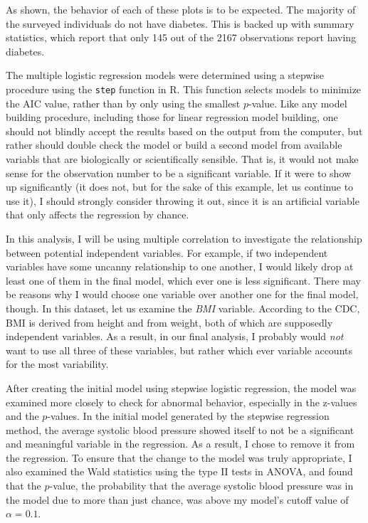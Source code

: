 \documentclass[letter,12pt]{article}
\begin{document}
	As shown, the behavior of each of these plots is to be expected. The majority of the surveyed individuals do not have diabetes. This is backed up with summary statistics, which report that only 145 out of the 2167 observations report having diabetes.\par
	The multiple logistic regression models were determined using a stepwise procedure using the \verb|step| function in R. This function selects models to minimize the AIC value, rather than by only using the smallest $p$-value. Like any model building procedure, including those for linear regression model building, one should not blindly accept the results based on the output from the computer, but rather should double check the model or build a second model from available variabls that are biologically or scientifically sensible. That is, it would not make sense for the observation number to be a significant variable. If it were to show up significantly (it does not, but for the sake of this example, let us continue to use it), I should strongly consider throwing it out, since it is an artificial variable that only affects the regression by chance.\par
	In this analysis, I will be using multiple correlation to investigate the relationship between potential independent variables. For example, if two independent variables have some uncanny relationship to one another, I would likely drop at least one of them in the final model, which ever one is less significant. There may be reasons why I would choose one variable over another one for the final model, though. In this dataset, let us examine the \textit{BMI} variable. According to the CDC, BMI is derived from height and from weight, both of which are supposedly independent variables. As a result, in our final analysis, I probably would \textit{not} want to use all three of these variables, but rather which ever variable accounts for the most variability.\par
	After creating the initial model using stepwise logistic regression, the model was examined more closely to check for abnormal behavior, especially in the z-values and the $p$-values. In the initial model generated by the stepwise regression method, the average systolic blood pressure showed itself to not be a significant and meaningful variable in the regression. As a result, I chose to remove it from the regression. To ensure that the change to the model was truly appropriate, I also examined the Wald statistics using the type II tests in ANOVA, and found that the $p$-value, the probability that the average systolic blood pressure was in the model due to more than just chance, was above my model's cutoff value of $\alpha = 0.1$.\par
\end{document}

